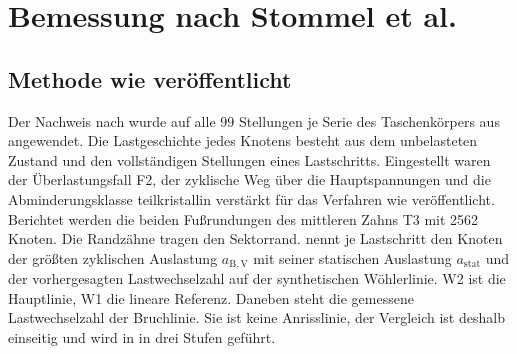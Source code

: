 \section{Bemessung nach Stommel et al.}
\label{sec:stommel_ergebnis}

\subsection{Methode wie veröffentlicht}
\label{sec:stommel_veroeffentlicht}

Der Nachweis nach  wurde auf alle 99 Stellungen je Serie des Taschenkörpers aus  angewendet. Die Lastgeschichte jedes Knotens besteht aus dem unbelasteten Zustand und den vollständigen Stellungen eines Lastschritts. Eingestellt waren der Überlastungsfall F2, der zyklische Weg über die Hauptspannungen und die Abminderungsklasse teilkristallin verstärkt für das Verfahren wie veröffentlicht. Berichtet werden die beiden Fußrundungen des mittleren Zahns T3 mit 2562 Knoten. Die Randzähne tragen den Sektorrand.  nennt je Lastschritt den Knoten der größten zyklischen Auslastung $a_{\mathrm{B,V}}$ mit seiner statischen Auslastung $a_{\mathrm{stat}}$ und der vorhergesagten Lastwechselzahl auf der synthetischen Wöhlerlinie. W2 ist die Hauptlinie, W1 die lineare Referenz. Daneben steht die gemessene Lastwechselzahl der Bruchlinie. Sie ist keine Anrisslinie, der Vergleich ist deshalb einseitig und wird in  in drei Stufen geführt.

